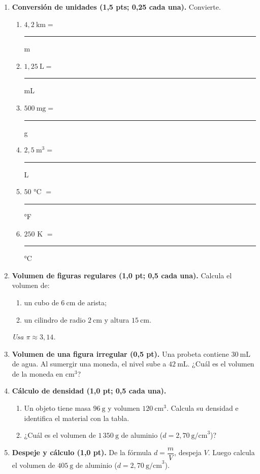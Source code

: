 \documentclass[12pt, letterpaper]{article}
\begin{document}
\begin{enumerate}[leftmargin=*, label=\textbf{\arabic*.}, itemsep=0.6em]

  \item \textbf{Conversión de unidades (1,5 pts; 0,25 cada una).} Convierte.
        \begin{enumerate}[label=\alph*), leftmargin=1.8em, itemsep=0.35em]
          \item $4{,}2\ \text{km} =$ \rule{1.8cm}{0.4pt} m
          \item $1{,}25\ \text{L} =$ \rule{1.8cm}{0.4pt} mL
          \item $500\ \text{mg} =$ \rule{1.8cm}{0.4pt} g
          \item $2{,}5\ \text{m}^3 =$ \rule{1.8cm}{0.4pt} L
          \item $50$ °C $=$ \rule{1.8cm}{0.4pt} °F
          \item $250$ K $=$ \rule{1.8cm}{0.4pt} °C
        \end{enumerate}

  \item \textbf{Volumen de figuras regulares (1,0 pt; 0,5 cada una).} Calcula el volumen de:
        \begin{enumerate}[label=\alph*), leftmargin=1.8em, itemsep=0.3em]
          \item un cubo de $6\ \text{cm}$ de arista;
          \item un cilindro de radio $2\ \text{cm}$ y altura $15\ \text{cm}$.
        \end{enumerate}
        \textit{Usa $\pi \approx 3{,}14$.}
        \vspace{1.2cm}

  \item \textbf{Volumen de una figura irregular (0,5 pt).} Una probeta contiene
        $30\ \text{mL}$ de agua. Al sumergir una moneda, el nivel sube a $42\ \text{mL}$.
        ¿Cuál es el volumen de la moneda en $\text{cm}^3$?
        \vspace{1.0cm}

  \item \textbf{Cálculo de densidad (1,0 pt; 0,5 cada una).}
        \begin{enumerate}[label=\alph*), leftmargin=1.8em, itemsep=0.45em]
          \item Un objeto tiene masa $96\ \text{g}$ y volumen $120\ \text{cm}^3$.
                Calcula su densidad e identifica el material con la tabla.
          \item ¿Cuál es el volumen de $1\,350\ \text{g}$ de aluminio
                ($d=2{,}70\ \text{g/cm}^3$)?
        \end{enumerate}
        \vspace{1.3cm}

  \item \textbf{Despeje y cálculo (1,0 pt).} De la fórmula $d=\dfrac{m}{V}$, despeja $V$.
        Luego calcula el volumen de $405\ \text{g}$ de aluminio
        ($d=2{,}70\ \text{g/cm}^3$).
        \vspace{1.2cm}
\end{enumerate}
\end{document}
